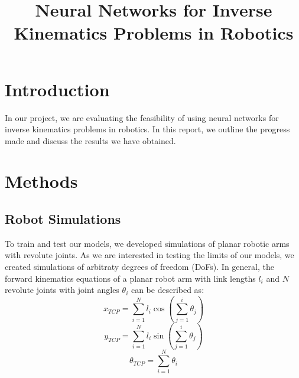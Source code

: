\documentclass[conference]{IEEEtran}
\begin{document}
\title{Neural Networks for Inverse Kinematics Problems in Robotics}

\author{
    \and
}

\maketitle

\section*{Introduction}

In our project, we are evaluating the feasibility of using neural networks for inverse kinematics problems in robotics. In this report, we outline the progress made and discuss the results we have obtained.

\section*{Methods}
\subsection*{Robot Simulations}

To train and test our models, we developed simulations of planar robotic arms with revolute joints. As we are interested in testing the limits of our models, we created simulations of arbitraty degrees of freedom (DoFs). In general, the forward kinematics equations of a planar robot arm with link lengths \( l_i \) and \( N \) revolute joints with joint angles \( \theta_i \) can be described as:
\begin{equation}
    x_{TCP} = \sum_{i=1}^{N}{l_i \cos\left( \sum_{j=1}^{i}{\theta_j} \right)}
\end{equation}
\begin{equation}
    y_{TCP} = \sum_{i=1}^{N}{l_i \sin\left( \sum_{j=1}^{i}{\theta_j} \right)}
\end{equation}
\begin{equation}
    \theta_{TCP} = \sum_{i=1}^{N}{\theta_i}
\end{equation}
\end{document}
